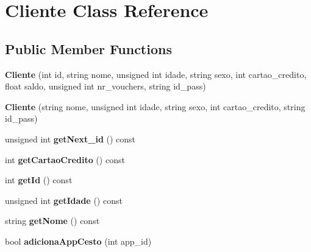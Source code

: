 \hypertarget{class_cliente}{\section{Cliente Class Reference}
\label{class_cliente}
}
\subsection*{Public Member Functions}
\begin{DoxyCompactItemize}
\item 
\hypertarget{class_cliente_a60db1e1e5141e29c8888a48f9b5140bb}{{\bfseries Cliente} (int id, string nome, unsigned int idade, string sexo, int cartao\+\_\+credito, float saldo, unsigned int nr\+\_\+vouchers, string id\+\_\+pass)}\label{class_cliente_a60db1e1e5141e29c8888a48f9b5140bb}

\item 
\hypertarget{class_cliente_a76a537299eb371d3b2b1d0f7bdf7a7e8}{{\bfseries Cliente} (string nome, unsigned int idade, string sexo, int cartao\+\_\+credito, string id\+\_\+pass)}\label{class_cliente_a76a537299eb371d3b2b1d0f7bdf7a7e8}

\item 
\hypertarget{class_cliente_af76bd3dca7cc6a21f94ee57c06de4427}{unsigned int {\bfseries get\+Next\+\_\+id} () const }\label{class_cliente_af76bd3dca7cc6a21f94ee57c06de4427}

\item 
\hypertarget{class_cliente_a9303d7e564ead678ba2bcb13157524a5}{int {\bfseries get\+Cartao\+Credito} () const }\label{class_cliente_a9303d7e564ead678ba2bcb13157524a5}

\item 
\hypertarget{class_cliente_a57130129d927bb9e777ccdecb8918db4}{int {\bfseries get\+Id} () const }\label{class_cliente_a57130129d927bb9e777ccdecb8918db4}

\item 
\hypertarget{class_cliente_ac182c452fcf4daac306280f707b16992}{unsigned int {\bfseries get\+Idade} () const }\label{class_cliente_ac182c452fcf4daac306280f707b16992}

\item 
\hypertarget{class_cliente_a0325de899469e2fed48ffda2b5b291cf}{string {\bfseries get\+Nome} () const }\label{class_cliente_a0325de899469e2fed48ffda2b5b291cf}

\item 
\hypertarget{class_cliente_ae3840fd9746f6d047a519fd63d14d9e4}{bool {\bfseries adiciona\+App\+Cesto} (int app\+\_\+id)}\label{class_cliente_ae3840fd9746f6d047a519fd63d14d9e4}


\end{DoxyCompactItemize}

